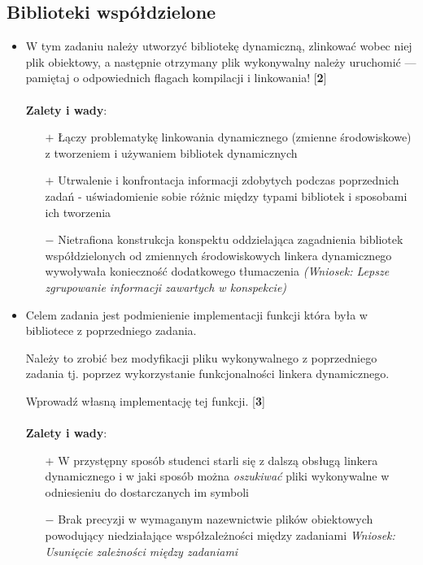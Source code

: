 \documentclass[12pt]{article}
\begin{document}
\subsection{Biblioteki współdzielone}
\begin{itemize}
\item W tym zadaniu należy utworzyć bibliotekę dynamiczną, zlinkować wobec niej
  plik obiektowy, a następnie otrzymany plik wykonywalny należy uruchomić ---
  pamiętaj o odpowiednich flagach kompilacji i linkowania! [\textbf{2}]\\ \\
  \textbf{Zalety i wady}:
  \begin{itemize}
  \item[$+$] Łączy problematykę linkowania dynamicznego (zmienne środowiskowe) z
    tworzeniem i używaniem bibliotek dynamicznych
  \item[$+$] Utrwalenie i konfrontacja informacji zdobytych podczas poprzednich
    zadań - uświadomienie sobie różnic między typami bibliotek i sposobami ich
    tworzenia
  \item[$-$] Nietrafiona konstrukcja konspektu oddzielająca zagadnienia
    bibliotek współdzielonych od zmiennych środowiskowych linkera dynamicznego
    wywoływała konieczność dodatkowego tłumaczenia \textit{(Wniosek: Lepsze
      zgrupowanie informacji zawartych w konspekcie)}
  \end{itemize}
\item Celem zadania jest podmienienie implementacji funkcji która była w
  bibliotece z poprzedniego zadania.

  Należy to zrobić bez modyfikacji pliku wykonywalnego z poprzedniego zadania
  tj. poprzez wykorzystanie funkcjonalności linkera dynamicznego.

  Wprowadź własną implementację tej funkcji. [\textbf{3}]\\ \\
  \textbf{Zalety i wady}:
  \begin{itemize}
  \item[$+$] W przystępny sposób studenci starli się z dalszą obsługą linkera
    dynamicznego i w jaki sposób można \textit{oszukiwać} pliki wykonywalne w
    odniesieniu do dostarczanych im symboli
  \item[$-$] Brak precyzji w wymaganym nazewnictwie plików obiektowych
    powodujący niedziałające współzależności między zadaniami \textit{Wniosek:
      Usunięcie zależności między zadaniami}
  \end{itemize}
\end{itemize}
\end{document}
